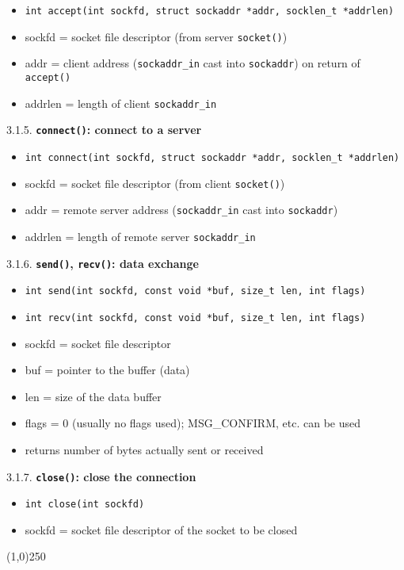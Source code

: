 \documentclass[10pt]{article}
\begin{document}
\begin{itemize}
\item \texttt{int accept(int sockfd, struct sockaddr *addr, socklen\_t *addrlen)}
\item sockfd = socket file descriptor (from server \texttt{socket()})
\item addr = client address (\texttt{sockaddr\_in} cast into \texttt{sockaddr}) on return of \texttt{accept()}
\item addrlen = length of client \texttt{sockaddr\_in}
\end{itemize}
3.1.5. \textbf{\texttt{connect()}: connect to a server}
\begin{itemize}
\item \texttt{int connect(int sockfd, struct sockaddr *addr, socklen\_t *addrlen)}
\item sockfd = socket file descriptor (from client \texttt{socket()})
\item addr = remote server address (\texttt{sockaddr\_in} cast into \texttt{sockaddr})
\item addrlen = length of remote server \texttt{sockaddr\_in}
\end{itemize}
3.1.6. \textbf{\texttt{send()}, \texttt{recv()}: data exchange}
\begin{itemize}
\item \texttt{int send(int sockfd, const void *buf, size\_t len, int flags)}
\item \texttt{int recv(int sockfd, const void *buf, size\_t len, int flags)}
\item sockfd = socket file descriptor
\item buf = pointer to the buffer (data)
\item len = size of the data buffer
\item flags = 0 (usually no flags used); MSG\_CONFIRM, etc. can be used
\item returns number of bytes actually sent or received
\end{itemize}
3.1.7. \textbf{\texttt{close()}: close the connection}
\begin{itemize}
\item \texttt{int close(int sockfd)}
\item sockfd = socket file descriptor of the socket to be closed
\end{itemize}
\begin{center}
\line(1,0){250}
\end{center}
\end{document}
